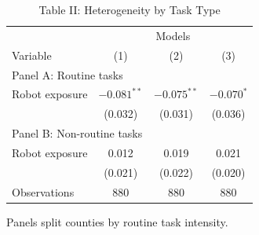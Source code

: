 \documentclass{article}
\begin{document}
\begin{table}[htbp]
\centering
\caption{Table II: Heterogeneity by Task Type}
\begin{threeparttable}
\begin{tabular}{lccc}
\toprule
 & \multicolumn{3}{c}{Models} \\
Variable & (1) & (2) & (3) \\
\midrule
\multicolumn{4}{l}{Panel A: Routine tasks} \\
Robot exposure & $-0.081^{**}$ & $-0.075^{**}$ & $-0.070^{*}$ \\
 & (0.032) & (0.031) & (0.036) \\
\multicolumn{4}{l}{Panel B: Non-routine tasks} \\
Robot exposure & 0.012 & 0.019 & 0.021 \\
 & (0.021) & (0.022) & (0.020) \\
Observations & 880 & 880 & 880 \\
\bottomrule
\end{tabular}
\begin{tablenotes}[flushleft]
\item Panels split counties by routine task intensity.
\end{tablenotes}
\end{threeparttable}
\end{table}
\end{document}
